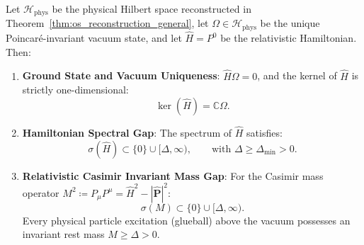 \begin{theorem}
\label{thm:relativistic_mass_gap}
Let $\mathcal{H}_{\mathrm{phys}}$ be the physical Hilbert space reconstructed in Theorem~\ref{thm:os_reconstruction_general}, let $\Omega \in \mathcal{H}_{\mathrm{phys}}$ be the unique Poincar\'e-invariant vacuum state, and let $\hat{H} = P^0$ be the relativistic Hamiltonian.
Then:
\begin{enumerate}[label=\textup{(\roman*)}]
    \item \textbf{Ground State and Vacuum Uniqueness}: $\hat{H} \Omega = 0$, and the kernel of $\hat{H}$ is strictly one-dimensional:
    \begin{equation}
    \label{eq:vacuum_kernel_one_dim}
    \ker(\hat{H}) = \mathbb{C} \Omega.
    \end{equation}

    \item \textbf{Hamiltonian Spectral Gap}: The spectrum of $\hat{H}$ satisfies:
    \begin{equation}
    \label{eq:hamiltonian_gap_spectrum}
    \sigma(\hat{H}) \subset \{0\} \cup [\Delta, \infty), \qquad \text{with } \Delta \ge \Delta_{\min} > 0.
    \end{equation}

    \item \textbf{Relativistic Casimir Invariant Mass Gap}: For the Casimir mass operator $M^2 \coloneqq P_\mu P^\mu = \hat{H}^2 - |\hat{\mathbf{P}}|^2$:
    \begin{equation}
    \label{eq:casimir_mass_spectrum}
    \sigma(M) \subset \{0\} \cup [\Delta, \infty).
    \end{equation}
    Every physical particle excitation (glueball) above the vacuum possesses an invariant rest mass $M \ge \Delta > 0$.
\end{enumerate}
\end{theorem}


